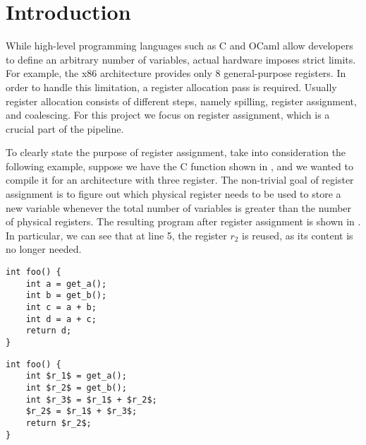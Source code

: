 
\chapter{Introduction}
\label{cha:intro}

While high-level programming languages such as C and OCaml allow developers to define an arbitrary number of variables, actual hardware imposes strict limits. For example, the x86 architecture provides only 8 general-purpose registers.
In order to handle this limitation, a register allocation pass is required. Usually register allocation consists of different steps, namely spilling, register assignment, and coalescing. For this project we focus on register assignment, which is a crucial part of the pipeline.

To clearly state the purpose of register assignment, take into consideration the following example, suppose we have the C function shown in , and we wanted to compile it for an architecture with three register. The non-trivial goal of register assignment is to figure out which physical register needs to be used to store a new variable whenever the total number of variables is greater than the number of physical registers. The resulting program after register assignment is shown in . In particular, we can see that at line 5, the register $r_2$ is reused, as its content is no longer needed.

\begin{minipage}{0.48\linewidth}
\centering
\lstset{style=C}
\begin{lstlisting}[caption={C program returning $2a+b$.}, label={fig:cbefore}]
int foo() {
    int a = get_a();
    int b = get_b();
    int c = a + b;
    int d = a + c;
    return d;
}
\end{lstlisting}
\end{minipage}
\hfill
\begin{minipage}{0.48\linewidth}
\centering
\lstset{style=C}
\begin{lstlisting}[caption={Same C program after register assignment.}, label={fig:cafter}]
int foo() {
    int $r_1$ = get_a();
    int $r_2$ = get_b();
    int $r_3$ = $r_1$ + $r_2$;
    $r_2$ = $r_1$ + $r_3$;
    return $r_2$;
}
\end{lstlisting}
\end{minipage}

